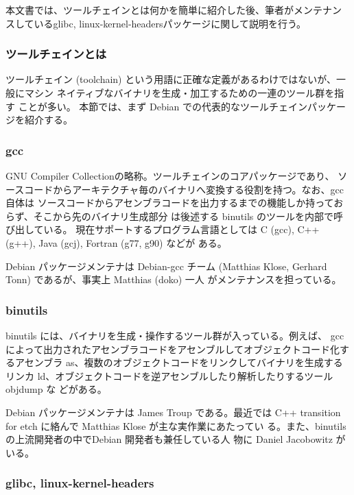 \documentclass[mingoth]{jsarticle}
\begin{document}
   本文書では、ツールチェインとは何かを簡単に紹介した後、筆者がメンテナン
   スしているglibc, linux-kernel-headersパッケージに関して説明を行う。

\subsubsection{ツールチェインとは}

   ツールチェイン (toolchain) という用語に正確な定義があるわけではないが、一般にマシン
   ネイティブなバイナリを生成・加工するための一連のツール群を指す
   ことが多い。
   本節では、まず Debian での代表的なツールチェインパッケージを紹介する。

  \subsubsection{gcc}

    GNU Compiler Collectionの略称。ツールチェインのコアパッケージであり、
    ソースコードからアーキテクチャ毎のバイナリへ変換する役割を持つ。なお、gcc 自体は
    ソースコードからアセンブラコードを出力するまでの機能しか持っておらず、そこから先のバイナリ生成部分
    は後述する
    binutils のツールを内部で呼び出している。
    現在サポートするプログラム言語としては C (gcc), C++ (g++), Java
    (gcj), Fortran (g77, g90) などが
    ある。

    Debian パッケージメンテナは Debian-gcc チーム 
    (Matthias Klose, Gerhard Tonn) であるが、事実上 Matthias (doko) 一人
    がメンテナンスを担っている。

  \subsubsection{binutils}

    binutils には、バイナリを生成・操作するツール群が入っている。例えば、
    gcc によって出力されたアセンブラコードをアセンブルしてオブジェクトコード化するアセンブラ
    as、複数のオブジェクトコードをリンクしてバイナリを生成するリンカ
    ld、オブジェクトコードを逆アセンブルしたり解析したりするツール objdump な
    どがある。

    Debian パッケージメンテナは James Troup である。最近では C++
    transition for etch に絡んで Matthias Klose が主な実作業にあたってい
    る。また、binutils の上流開発者の中でDebian 開発者も兼任している人
    物に Daniel Jacobowitz がいる。

  \subsubsection{glibc, linux-kernel-headers}
\end{document}
